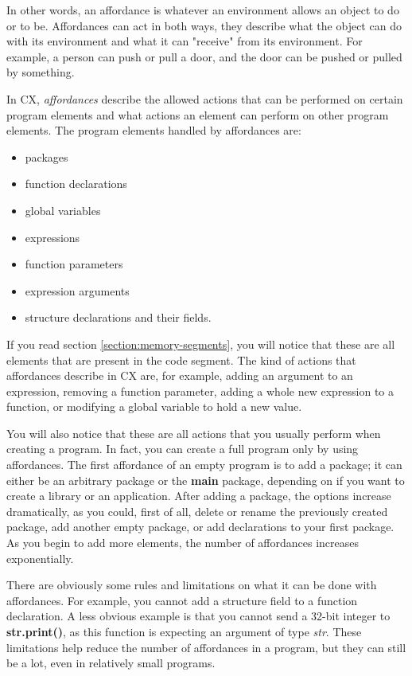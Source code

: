 \documentclass[11pt,fleqn,openany]{book} %
\begin{document}
In other words, an affordance is whatever an environment allows an object to do or to be. Affordances can act in both ways, they describe what the object can do with its environment and what it can "receive" from its environment. For example, a person can push or pull a door, and the door can be pushed or pulled by something.

In CX, \emph{affordances} describe the allowed actions that can be performed on certain program elements and what actions an element can perform on other program elements. The program elements handled by affordances are:
\begin{itemize}
    \item packages
    \item function declarations
    \item global variables
    \item expressions
    \item function parameters
    \item expression arguments
    \item structure declarations and their fields.
\end{itemize}

If you read section \ref{section:memory-segments}, you will notice that these are all elements that are present in the code segment. The kind of actions that affordances describe in CX are, for example, adding an argument to an expression, removing a function parameter, adding a whole new expression to a function, or modifying a global variable to hold a new value.

You will also notice that these are all actions that you usually perform when creating a program. In fact, you can create a full program only by using affordances. The first affordance of an empty program is to add a package; it can either be an arbitrary package or the \textbf{main} package, depending on if you want to create a library or an application. After adding a package, the options increase dramatically, as you could, first of all, delete or rename the previously created package, add another empty package, or add declarations to your first package. As you begin to add more elements, the number of affordances increases exponentially.

There are obviously some rules and limitations on what it can be done with affordances. For example, you cannot add a structure field to a function declaration. A less obvious example is that you cannot send a 32-bit integer to \textbf{str.print()}, as this function is expecting an argument of type \emph{str}. These limitations help reduce the number of affordances in a program, but they can still be a lot, even in relatively small programs.
\end{document}
